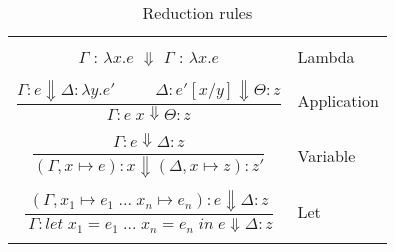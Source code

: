 \begin{table}

\centering

\begin{tabular}{|cl|}
\hline
& \\

$\Gamma$ : $\lambda x . e$ $\Downarrow$ $\Gamma$ : $\lambda x . e$ & Lambda \\

& \\

$\dfrac{\Gamma : e \Downarrow \Delta : \lambda y . e' \;\;\;\;\;\;\;\;\; \Delta : e' [x/y] \Downarrow \Theta : z }{ \Gamma : e \; x \Downarrow \Theta : z}$ & Application \\

& \\

$\dfrac{\Gamma : e \Downarrow \Delta : z}{( \Gamma , x \mapsto e) : x \Downarrow (\Delta , x \mapsto z) : z' }$ & Variable \\

& \\

$\dfrac{(\Gamma , x_1 \mapsto e_1 \; ... \; x_n \mapsto e_n) : e \Downarrow \Delta : z}{ \
\Gamma : let \; x_1 = e_1 \; ... \; x_n = e_n \; in \; e \Downarrow \Delta : z }$ & Let \\

& \\

\hline
\end{tabular}

\caption{Reduction rules}

\end{table}



